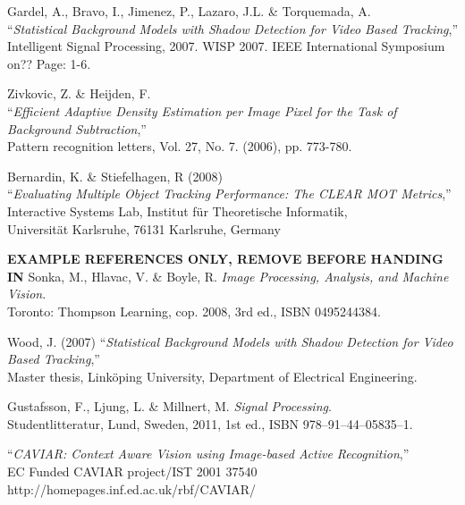\begin{thebibliography}{9}

	Gardel, A., Bravo, I., Jimenez, P., Lazaro, J.L. \& Torquemada, A.\\
	``\textit{Statistical Background Models with Shadow Detection for Video Based Tracking},''\\ Intelligent Signal Processing, 2007. WISP 2007. IEEE International Symposium on?? Page: 1-6.
	
	Zivkovic, Z. \& Heijden, F.\\
	``\textit{Efficient Adaptive Density Estimation per Image Pixel for the Task of Background Subtraction},''\\
	Pattern recognition letters, Vol. 27, No. 7. (2006), pp. 773-780.

	Bernardin, K. \& Stiefelhagen, R (2008)\\
	``\textit{Evaluating Multiple Object Tracking Performance: The CLEAR MOT Metrics},''\\
	Interactive Systems Lab, Institut für Theoretische Informatik,\\
	Universität Karlsruhe, 76131 Karlsruhe, Germany
	
\vspace{2cm}
\LARGE{\textbf{EXAMPLE REFERENCES ONLY, REMOVE BEFORE HANDING IN}}
\normalsize
{}
	Sonka, M., Hlavac, V. \& Boyle, R. 
	\emph{Image Processing, Analysis, and Machine Vision}.\\
	Toronto: Thompson Learning,
	cop. 2008, 3rd ed.,
	ISBN 0495244384.
	
	Wood, J. (2007)
	``\textit{Statistical Background Models with Shadow Detection for Video Based Tracking},''\\
	Master thesis, Linköping University, Department of Electrical Engineering.	

	Gustafsson, F., Ljung, L. \& Millnert, M.
	\emph{Signal Processing}.\\
	Studentlitteratur, Lund, Sweden,
	2011, 1st ed.,
	ISBN 978--91--44--05835--1.



	``\textit{CAVIAR: Context Aware Vision using Image-based Active Recognition},''\\
	EC Funded CAVIAR project/IST 2001 37540\\
	http://homepages.inf.ed.ac.uk/rbf/CAVIAR/
	


\end{thebibliography}